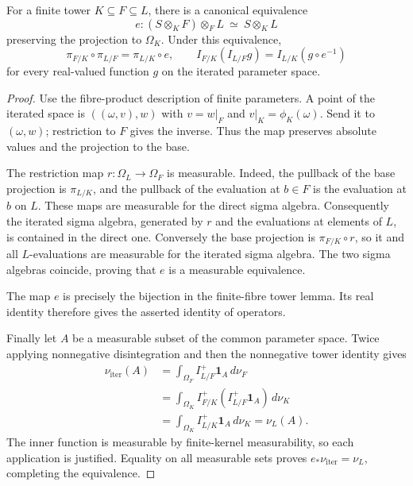 \begin{proposition}
\label{prop:finite-tower}
\leanok
{}
For a finite tower $K\subseteq F\subseteq L$, there is a canonical
equivalence
\[
 e:(S\otimes_KF)\otimes_FL\ \simeq\ S\otimes_KL
\]
preserving the projection to $\Omega_K$. Under this equivalence,
\[
 \pi_{F/K}\circ\pi_{L/F}=\pi_{L/K}\circ e,\qquad
 I_{F/K}(I_{L/F}g)=I_{L/K}(g\circ e^{-1})
\]
for every real-valued function $g$ on the iterated parameter space.
\end{proposition}
\begin{proof}
Use the fibre-product description of finite parameters. A point of
the iterated space is $((\omega,v),w)$ with $v=w|_F$ and
$v|_K=\phi_K(\omega)$. Send it to $(\omega,w)$; restriction to $F$
gives the inverse. Thus the map preserves absolute values and the
projection to the base.

The restriction map $r:\Omega_L\to\Omega_F$ is measurable. Indeed,
the pullback of the base projection is $\pi_{L/K}$, and the pullback
of the evaluation at $b\in F$ is the evaluation at $b$ on $L$.
These maps are measurable for the direct sigma algebra. Consequently
the iterated sigma algebra, generated by $r$ and the evaluations at
elements of $L$, is contained in the direct one. Conversely the base
projection is $\pi_{F/K}\circ r$, so it and all $L$-evaluations are
measurable for the iterated sigma algebra. The two sigma algebras
coincide, proving that $e$ is a measurable equivalence.

The map $e$ is precisely the bijection in the finite-fibre tower
lemma. Its real identity therefore gives the asserted identity of
operators.

Finally let $A$ be a measurable subset of the common parameter space.
Twice applying nonnegative disintegration and then the nonnegative
tower identity gives
\begin{align*}
 \nu_{\mathrm{iter}}(A)
 &=\int_{\Omega_F}I^+_{L/F}\mathbf1_A\,d\nu_F\\
 &=\int_{\Omega_K}I^+_{F/K}(I^+_{L/F}\mathbf1_A)\,d\nu_K\\
 &=\int_{\Omega_K}I^+_{L/K}\mathbf1_A\,d\nu_K
 =\nu_L(A).
\end{align*}
The inner function is measurable by finite-kernel measurability, so
each application is justified. Equality on all measurable sets proves
$e_*\nu_{\mathrm{iter}}=\nu_L$, completing the equivalence.
\end{proof}

